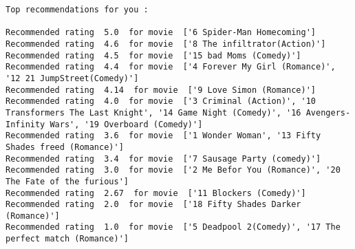 \documentclass[11pt]{article}
\begin{document}
    \begin{Verbatim}[commandchars=\\\{\}]
Top recommendations for you : 

Recommended rating  5.0  for movie  ['6 Spider-Man Homecoming']
Recommended rating  4.6  for movie  ['8 The infiltrator(Action)']
Recommended rating  4.5  for movie  ['15 bad Moms (Comedy)']
Recommended rating  4.4  for movie  ['4 Forever My Girl (Romance)', '12 21 JumpStreet(Comedy)']
Recommended rating  4.14  for movie  ['9 Love Simon (Romance)']
Recommended rating  4.0  for movie  ['3 Criminal (Action)', '10 Transformers The Last Knight', '14 Game Night (Comedy)', '16 Avengers- Infinity Wars', '19 Overboard (Comedy)']
Recommended rating  3.6  for movie  ['1 Wonder Woman', '13 Fifty Shades freed (Romance)']
Recommended rating  3.4  for movie  ['7 Sausage Party (comedy)']
Recommended rating  3.0  for movie  ['2 Me Befor You (Romance)', '20 The Fate of the furious']
Recommended rating  2.67  for movie  ['11 Blockers (Comedy)']
Recommended rating  2.0  for movie  ['18 Fifty Shades Darker (Romance)']
Recommended rating  1.0  for movie  ['5 Deadpool 2(Comedy)', '17 The perfect match (Romance)']

    \end{Verbatim}


    
    
    
    
\end{document}
